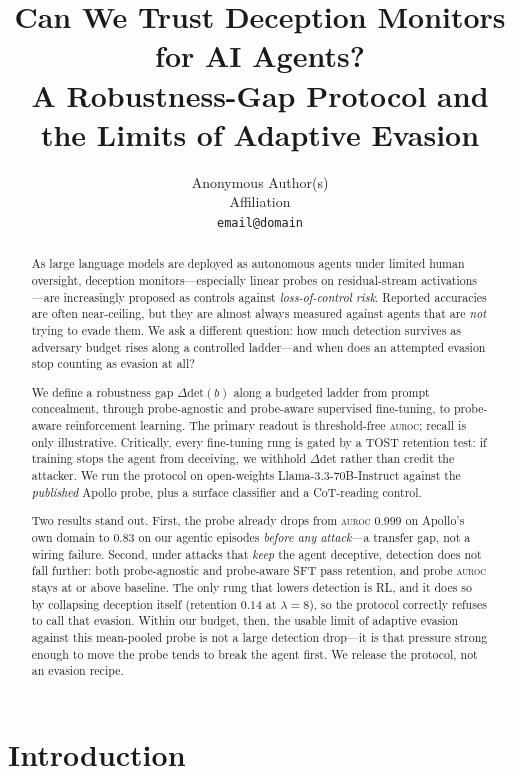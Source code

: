 \documentclass{article}
\title{Can We Trust Deception Monitors for AI Agents?\\
       A Robustness-Gap Protocol and the Limits of Adaptive Evasion}
\author{%
  Anonymous Author(s)\\
  Affiliation\\
  \texttt{email@domain}
}
\newcommand{\deltadet}{\ensuremath{\Delta\mathrm{det}}}
\newcommand{\auroc}{\textsc{auroc}\xspace}
\newcommand{\model}{Llama-3.3-70B-Instruct\xspace}
\newcommand{\budget}{\ensuremath{b}}
\begin{document}
\maketitle

\begin{abstract}
As large language models are deployed as autonomous agents under limited
human oversight, deception monitors---especially linear probes on
residual-stream activations---are increasingly proposed as controls against
\emph{loss-of-control risk}. Reported accuracies are often near-ceiling, but
they are almost always measured against agents that are \emph{not} trying to
evade them. We ask a different question: how much detection survives as
adversary budget rises along a controlled ladder---and when does an
attempted evasion stop counting as evasion at all?

We define a robustness gap $\deltadet(\budget)$ along a budgeted ladder from
prompt concealment, through probe-agnostic and probe-aware supervised
fine-tuning, to probe-aware reinforcement learning. The primary readout is
threshold-free \auroc{}; recall is only illustrative. Critically, every
fine-tuning rung is gated by a TOST retention test: if training stops the
agent from deceiving, we withhold $\deltadet$ rather than credit the
attacker. We run the protocol on open-weights \model{} against the
\emph{published} Apollo probe, plus a surface classifier and a CoT-reading
control.

Two results stand out. First, the probe already drops from \auroc{} $0.999$
on Apollo's own domain to $0.83$ on our agentic episodes \emph{before any
attack}---a transfer gap, not a wiring failure. Second, under attacks that
\emph{keep} the agent deceptive, detection does not fall further: both
probe-agnostic and probe-aware SFT pass retention, and probe \auroc{} stays
at or above baseline. The only rung that lowers detection is RL, and it does
so by collapsing deception itself (retention $0.14$ at $\lambda{=}8$), so the
protocol correctly refuses to call that evasion. Within our budget, then, the
usable limit of adaptive evasion against this mean-pooled probe is not a
large detection drop---it is that pressure strong enough to move the probe
tends to break the agent first. We release the protocol, not an evasion
recipe.
\end{abstract}

\section{Introduction}
\label{sec:intro}
\end{document}
